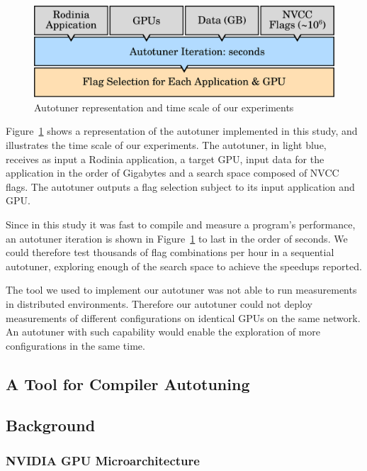 \begin{figure}[htpb]
    \centering
    \includegraphics[width=.65\textwidth]{./images/overview_gpus}
    \caption{Autotuner representation and time scale of our experiments}
    \label{fig:overview-gpus}
\end{figure}

Figure~\ref{fig:overview-gpus} shows a representation of the autotuner
implemented in this study, and illustrates the time scale of our experiments.
The autotuner, in light blue, receives as input a Rodinia application, a target
GPU, input data for the application in the order of Gigabytes and a search
space composed of NVCC flags. The autotuner outputs a flag selection subject to
its input application and GPU.

Since in this study it was fast to compile and measure a program's performance,
an autotuner iteration is shown in Figure~\ref{fig:overview-gpus} to last in
the order of seconds. We could therefore test thousands of flag combinations
per hour in a sequential autotuner, exploring enough of the search space to
achieve the speedups reported.

The tool we used to implement our autotuner was not able to run measurements in
distributed environments. Therefore our autotuner could not deploy measurements
of different configurations on identical GPUs on the same network. An autotuner
with such capability would enable the exploration of more configurations in the
same time.

\subsection{A Tool for Compiler Autotuning}

\subsection{Background}

\subsubsection{NVIDIA GPU Microarchitecture}
\label{sec:GPUsCUDA}

